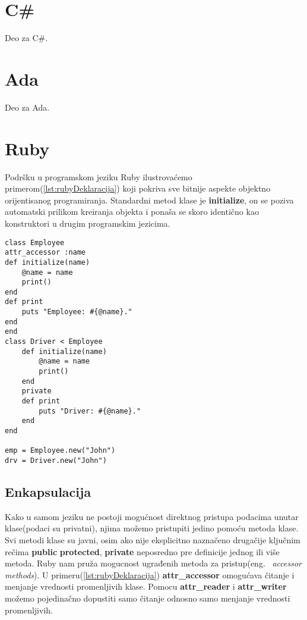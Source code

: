 \documentclass[a4paper]{article}
\begin{document}
\newpage

\section{C\#}
\label{sec:csharp}
Deo za C\#.

\section{Ada}
\label{sec:ada}
Deo za Ada.

\newpage

\section{Ruby}
\label{sec:ruby}
 Podršku u programskom jeziku Ruby ilustrovaćemo primerom(\ref{lst:rubyDeklaracija}) koji pokriva sve bitnije aspekte objektno orijentisanog programiranja. Standardni metod klase je \textbf{initialize}, on se poziva automatski prilikom kreiranja objekta i ponaša se skoro identično kao konstruktori u drugim programskim jezicima.

\begin{lstlisting}[caption={Primer objektno orijentisanog programiranja u jeziku Ruby.},frame=single, label=lst:rubyDeklaracija]
class Employee
attr_accessor :name
def initialize(name)
	@name = name
	print()
end
def print
	puts "Employee: #{@name}."
end
end
class Driver < Employee
	def initialize(name)
		@name = name
		print()
	end
	private
	def print
		puts "Driver: #{@name}."
	end
end

emp = Employee.new("John")
drv = Driver.new("John")
\end{lstlisting}

\subsection{Enkapsulacija}
\label{subsec:rubyEnkapsulacija}
Kako u samom jeziku ne postoji mogućnost direktnog pristupa podacima unutar klase(podaci su privatni), njima možemo pristupiti jedino pomoću metoda klase. Svi metodi klase su javni, osim ako nije eksplicitno naznačeno drugačije ključnim rečima \textbf{public} \textbf{protected}, \textbf{private} neposredno pre definicije jednog ili više metoda. Ruby nam pruža mogucnost ugrađenih metoda za pristup(eng. ~{\em accessor methods}). U primeru(\ref{lst:rubyDeklaracija})  \textbf{attr\_accessor} omogućava čitanje i menjanje vrednosti promenljivih klase. Pomocu \textbf{attr\_reader} i \textbf{attr\_writer} možemo pojedinačno dopustiti samo čitanje odnosno samo menjanje vrednosti promenljivih.
\end{document}

